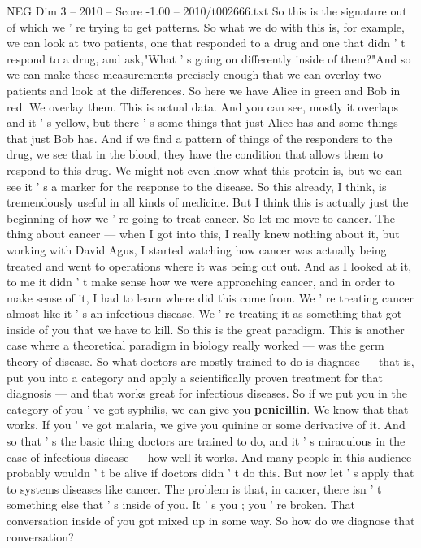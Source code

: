 \begin{textsample}{NEG Dim 3 – 2010 – Score -1.00 – 2010/t002666.txt}
So this is the signature out of which we ' re trying to get patterns.
So what we do with this is, for example, we can look at two patients, one that responded to a drug and one that didn ' t respond to a drug, and ask,"What ' s going on differently inside of them?"And so we can make these measurements precisely enough that we can overlay two patients and look at the differences.
So here we have Alice in green and Bob in red.
We overlay them.
This is actual data.
And you can see, mostly it overlaps and it ' s yellow, but there ' s some things that just Alice has and some things that just Bob has.
And if we find a pattern of things of the responders to the drug, we see that in the blood, they have the condition that allows them to respond to this drug.
We might not even know what this protein is, but we can see it ' s a marker for the response to the disease.
So this already, I think, is tremendously useful in all kinds of medicine.
But I think this is actually just the beginning of how we ' re going to treat cancer.
So let me move to cancer.
The thing about cancer — when I got into this, I really knew nothing about it, but working with David Agus, I started watching how cancer was actually being treated and went to operations where it was being cut out.
And as I looked at it, to me it didn ' t make sense how we were approaching cancer, and in order to make sense of it, I had to learn where did this come from.
We ' re treating cancer almost like it ' s an infectious disease.
We ' re treating it as something that got inside of you that we have to kill.
So this is the great paradigm.
This is another case where a theoretical paradigm in biology really worked — was the germ theory of disease.
So what doctors are mostly trained to do is diagnose — that is, put you into a category and apply a scientifically proven treatment for that diagnosis — and that works great for infectious diseases.
So if we put you in the category of you ' ve got syphilis, we can give you \textbf{penicillin}.
We know that that works.
If you ' ve got malaria, we give you quinine or some derivative of it.
And so that ' s the basic thing doctors are trained to do, and it ' s miraculous in the case of infectious disease — how well it works.
And many people in this audience probably wouldn ' t be alive if doctors didn ' t do this.
But now let ' s apply that to systems diseases like cancer.
The problem is that, in cancer, there isn ' t something else that ' s inside of you.
It ' s you ; you ' re broken.
That conversation inside of you got mixed up in some way.
So how do we diagnose that conversation?

\end{textsample}
